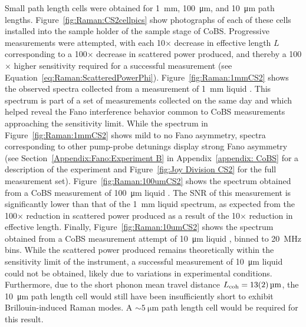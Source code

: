 Small path length cells were obtained for \SI{1}{\milli\meter}, \SI{100}{\micro\meter}, and \SI{10}{\micro\meter} path lengths. Figure~\ref{fig:Raman:CS2cellpics} show photographs of each of these cells installed into the sample holder of the sample stage of \ac{CoBS}. Progressive measurements were attempted, with each 10\(\times\) decrease in effective length \(L\) corresponding to a 100\(\times\) decrease in scattered power produced, and thereby a 100\(\times\) higher sensitivity required for a successful measurement (see Equation~\ref{eq:Raman:ScatteredPowerPhi}). Figure~\ref{fig:Raman:1mmCS2} shows the observed spectra collected from a measurement of \SI{1}{\milli\meter} liquid . This spectrum is part of a set of measurements collected on the same day and which helped reveal the Fano interference behavior common to \ac{CoBS} measurements approaching the sensitivity limit. While the spectrum in Figure~\ref{fig:Raman:1mmCS2} shows mild to no Fano asymmetry, spectra corresponding to other pump-probe detunings display strong Fano asymmetry (see Section~\ref{Appendix:Fano:Experiment B} in Appendix~\ref{appendix: CoBS} for a description of the experiment and Figure~\ref{fig:Joy Division CS2} for the full measurement set). Figure~\ref{fig:Raman:100umCS2} shows the spectrum obtained from a \ac{CoBS} measurement of \SI{100}{\micro\meter} liquid . The \ac{SNR} of this measurement is significantly lower than that of the \SI{1}{\milli\meter} liquid  spectrum, as expected from the 100\(\times\) reduction in scattered power produced as a result of the 10\(\times\) reduction in effective length. Finally, Figure~\ref{fig:Raman:10umCS2} shows the spectrum obtained from a \ac{CoBS} measurement attempt of \SI{10}{\micro\meter} liquid , binned to \SI{20}{\mega\hertz} bins. While the scattered power produced remains theoretically within the sensitivity limit of the instrument, a successful measurement of \SI{10}{\micro\meter} liquid  could not be obtained, likely due to variations in experimental conditions. Furthermore, due to the short phonon mean travel distance \(L_{\rm coh} = \SI{13(2)}{\micro\meter}\), the \SI{10}{\micro\meter} path length cell would still have been insufficiently short to exhibit Brillouin-induced Raman modes. A \(\sim\SI{5}{\micro\meter}\) path length cell would be required for this result.

